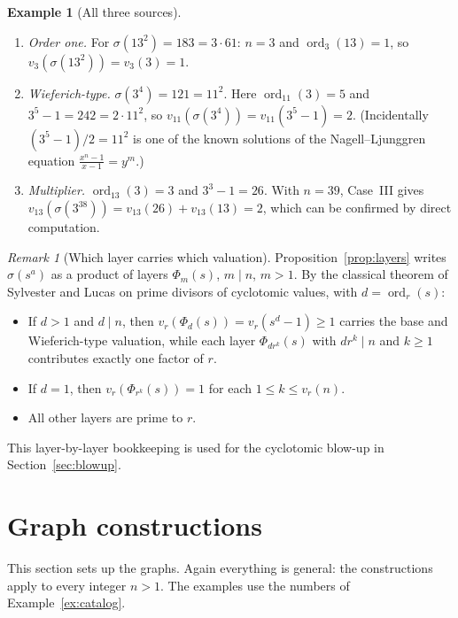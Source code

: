 \documentclass[11pt]{article}
\theoremstyle{definition}
\newtheorem{example}[theorem]{Example}
\theoremstyle{remark}
\newtheorem{remark}[theorem]{Remark}
\DeclareMathOperator{\ord}{ord}
\begin{document}
\begin{example}[All three sources]\label{ex:three}
\begin{enumerate}[label=(\alph*)]
\item \emph{Order one.}  For $\sigma(13^2)=183=3\cdot61$: $n=3$ and
  $\ord_3(13)=1$, so $v_3(\sigma(13^2))=v_3(3)=1$.
\item \emph{Wieferich-type.}  $\sigma(3^4)=121=11^2$.  Here $\ord_{11}(3)=5$
  and $3^5-1=242=2\cdot 11^2$, so $v_{11}(\sigma(3^4))=v_{11}(3^5-1)=2$.
  (Incidentally $(3^5-1)/2=11^2$ is one of the known solutions of the
  Nagell--Ljunggren equation $\frac{x^n-1}{x-1}=y^m$.)
\item \emph{Multiplier.}  $\ord_{13}(3)=3$ and $3^3-1=26$.  With $n=39$,
  Case~III gives $v_{13}(\sigma(3^{38}))=v_{13}(26)+v_{13}(13)=2$, which can
  be confirmed by direct computation.
\end{enumerate}
\end{example}

\begin{remark}[Which layer carries which valuation]\label{rem:sylvester}
Proposition~\ref{prop:layers} writes $\sigma(s^a)$ as a product of layers
$\Phi_m(s)$, $m\mid n$, $m>1$.  By the classical theorem of Sylvester and
Lucas on prime divisors of cyclotomic values, with $d=\ord_r(s)$:
\begin{itemize}[leftmargin=1.5em]
\item If $d>1$ and $d\mid n$, then $v_r(\Phi_d(s))=v_r(s^d-1)\ge 1$ carries
  the base and Wieferich-type valuation, while each layer $\Phi_{dr^k}(s)$
  with $dr^k\mid n$ and $k\ge1$ contributes exactly one factor of $r$.
\item If $d=1$, then $v_r(\Phi_{r^k}(s))=1$ for each $1\le k\le v_r(n)$.
\item All other layers are prime to $r$.
\end{itemize}
This layer-by-layer bookkeeping is used for the cyclotomic blow-up in
Section~\ref{sec:blowup}.
\end{remark}

\section{Graph constructions}\label{sec:graphs}

This section sets up the graphs.  Again everything is general: the
constructions apply to every integer $n>1$.  The examples use the numbers
of Example~\ref{ex:catalog}.
\end{document}
